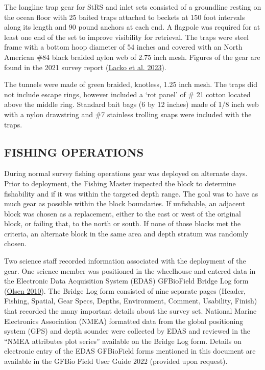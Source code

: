 \documentclass[12pt]{article}\usepackage[]{graphicx}\usepackage[]{color}
\begin{document}
The longline trap gear for StRS and inlet sets consisted of a groundline resting on the ocean floor with 25 baited traps attached to beckets at 150 foot intervals along its length and 90 pound anchors at each end. A flagpole was required for at least one end of the set to improve visibility for retrieval. The traps were steel frame with a bottom hoop diameter of 54 inches and covered with an North American \#84 black braided nylon web of 2.75 inch mesh. Figures of the gear are found in the 2021 survey report (\protect\hyperlink{ref-Lacko2023}{Lacko et al. 2023}).

The tunnels were made of green braided, knotless, 1.25 inch mesh. The traps did not include escape rings, however included a `rot panel' of \# 21 cotton located above the middle ring. Standard bait bags (6 by 12 inches) made of 1/8 inch web with a nylon drawstring and \#7 stainless trolling snaps were included with the traps.

\hypertarget{fishing-operations}{%
\subsection{FISHING OPERATIONS}\label{fishing-operations}}

During normal survey fishing operations gear was deployed on alternate days. Prior to deployment, the Fishing Master inspected the block to determine fishability and if it was within the targeted depth range. The goal was to have as much gear as possible within the block boundaries. If unfishable, an adjacent block was chosen as a replacement, either to the east or west of the original block, or failing that, to the north or south. If none of those blocks met the criteria, an alternate block in the same area and depth stratum was randomly chosen.

Two science staff recorded information associated with the deployment of the gear. One science member was positioned in the wheelhouse and entered data in the Electronic Data Acquisition System (EDAS) GFBioField Bridge Log form (\protect\hyperlink{ref-Olsen2010}{Olsen 2010}). The Bridge Log form consisted of nine separate pages (Header, Fishing, Spatial, Gear Specs, Depths, Environment, Comment, Usability, Finish) that recorded the many important details about the survey set. National Marine Electronics Association (NMEA) formatted data from the global positioning system (GPS) and depth sounder were collected by EDAS and reviewed in the ``NMEA attributes plot series'' available on the Bridge Log form. Details on electronic entry of the EDAS GFBioField forms mentioned in this document are available in the GFBio Field User Guide 2022 (provided upon request).
\end{document}
